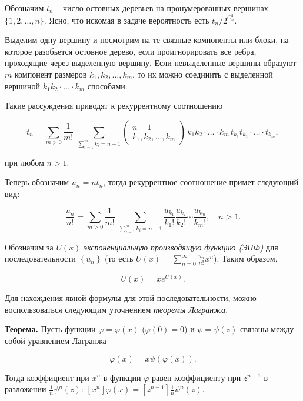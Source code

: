 \begin{ordre}

Обозначим $t_{n} $ -- число остовных деревьев на пронумерованных вершинах $\{ 1,2,\ldots ,n\} $. Ясно, что искомая в задаче вероятность есть $t_n/2^{C_n^2}$.

Выделим одну вершину и посмотрим на те связные компоненты или блоки, на которое разобьется остовное дерево, если проигнорировать все ребра, проходящие через выделенную вершину. Если невыделенные вершины образуют $m$ компонент размеров $k_{1} ,k_{2} ,\ldots ,k_{m} $, то их можно соединить с выделенной вершиной $k_{1} k_{2} \cdot\ldots\cdot k_{m} $ способами.

Такие рассуждения приводят к рекуррентному соотношению

$$ t_{n} = \sum _{m>0}\frac{1}{m!}  \; \sum _{\sum_{i=1}^m k_i = n-1}\left(\begin{array}{c} {n-1} \\ {k_{1} ,k_{2} ,\ldots ,k_{m} } \end{array}\right) \, k_{1} k_{2} \cdot\ldots\cdot k_{m} \, t_{k_{1} } t_{k_{2} }\cdot\ldots\cdot t_{k_{m} }, $$

\noindent при любом $n>1$. 

Теперь обозначим $u_{n} =nt_{n} $, тогда рекуррентное соотношение примет следующий вид:

$$ \frac{u_{n} }{n!} =\sum _{m>0}\frac{1}{m!}  \; \sum _{\sum_{i=1}^m k_i = n-1}\frac{u_{k_{1} } }{k_{1} !} \frac{u_{k_{2} } }{k_{2} !} \cdots \frac{u_{k_{m} } }{k_{m} !}  ,\quad n>1.$$

Обозначим за $U(x)$ \textit{экспоненциальную производящую функцию (ЭПФ)} для последовательности $\left\{u_{n} \right\}$ (то есть $U(x)=\sum _{n=0}^{\infty }\frac{u_{n} }{n!} x^{n}  $). Таким образом,

$$U(x)=xe^{U(x)}.$$

Для нахождения явной формулы для этой последовательности, можно воспользоваться следующим уточнением \textit{теоремы Лагранжа}.

\textbf{Теорема.} Пусть функции $\varphi =\varphi (x)$ ($\varphi (0)=0$) и $\psi =\psi (z)$ связаны между собой уравнением Лагранжа 

$$\varphi (x)=x\psi \left(\varphi (x)\right).$$ 

Тогда коэффициент при $x^{n} $ в функции $\varphi $ равен коэффициенту при $z^{n-1} $ в разложении $\frac{1}{n} \psi ^{n} (z)$: $[x^{n}]\varphi(x) = [z^{n-1}]\frac{1}{n} \psi ^{n} (z)$.

\end{ordre}

